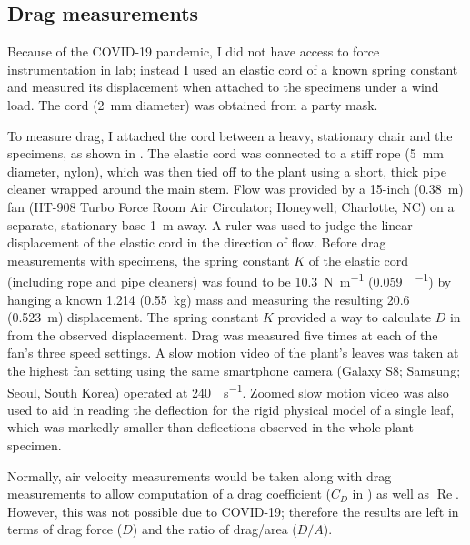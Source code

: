 \subsection{Drag measurements}
Because of the COVID-19 pandemic, I did not have access to force instrumentation in lab; instead I used an elastic cord of a known spring constant and measured its displacement when attached to the specimens under a wind load. The cord (\SI{2}{\milli\meter} diameter) was obtained from a party mask. 

To measure drag, I attached the cord between a heavy, stationary chair and the specimens, as shown in . The elastic cord was connected to a stiff rope (\SI{5}{\milli\meter} diameter, nylon), which was then tied off to the plant using a short, thick pipe cleaner wrapped around the main stem. Flow was provided by a 15-inch (\SI{0.38}{\meter}) fan (HT-908 Turbo Force Room Air Circulator; Honeywell; Charlotte, NC) on a separate, stationary base \SI{1}{\meter} away. A ruler was used to judge the linear displacement of the elastic cord in the direction of flow.  Before drag measurements with specimens, the spring constant $K$ of the elastic cord (including rope and pipe cleaners) was found to be \SI{10.3}{\newton\per\meter} (\SI{0.059}{\poundforce\per\inch}) by hanging a known \SI{1.214}{\pound} (\SI{0.55}{\kilo\gram}) mass and measuring the resulting \SI{20.6}{\inch} (\SI{0.523}{\meter}) displacement. The spring constant $K$ provided a way to calculate $D$ in  from the observed displacement. Drag was measured five times at each of the fan's three speed settings. A slow motion video of the plant's leaves was taken at the highest fan setting using the same smartphone camera (Galaxy S8; Samsung; Seoul, South Korea) operated at \SI{240}{\frame\per\second}. Zoomed slow motion video was also used to aid in reading the deflection for the rigid physical model of a single leaf, which was markedly smaller than deflections observed in the whole plant specimen. 

Normally, air velocity measurements would be taken along with drag measurements to allow computation of a drag coefficient ($C_D$ in ) as well as $\operatorname{Re}$. However, this was not possible due to COVID-19; therefore the results are left in terms of drag force ($D$) and the ratio of drag/area ($D/A$). 


